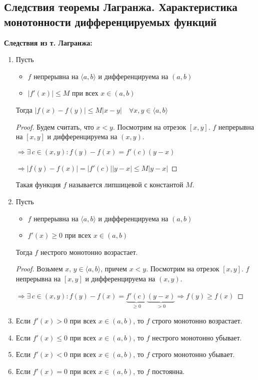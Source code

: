 \subsection{Следствия теоремы Лагранжа. Характеристика монотонности дифференцируемых функций \href{https://youtu.be/OXDjegAsmSU?t=6845}{\Walley}}
\textbf{Следствия из т. Лагранжа:}
\begin{enumerate}
    \item Пусть
    \begin{itemize}
        \item $f$ непрерывна на $\langle a, b \rangle$ и дифференцируема на $(a, b)$
        \item $|f'(x)| \leqslant M$ при всех $x \in (a, b)$
    \end{itemize}
    Тогда $|f(x) - f(y)| \leqslant M|x - y| \quad \forall x, y \in \langle a, b \rangle$
    \begin{proof}
        Будем считать, что $x < y$. Посмотрим на отрезок $[x, y]$. $f$ непрерывна на $[x, y]$ и дифференцируема на $(x, y)$. 

        $\Rightarrow \exists \, c \in (x, y) : f(y) - f(x) = f'(c)(y - x)$

        $\Rightarrow |f(y) - f(x)| = |f'(c)||y - x| \leqslant M|y - x|$
    \end{proof}
    \begin{notice}
        Такая функция $f$ называется липшицевой с константой $M$.
    \end{notice}
    \item Пусть
    \begin{itemize}
        \item $f$ непрерывна на $\langle a, b \rangle$ и дифференцируема на $(a, b)$
        \item $f'(x) \geqslant 0$ при всех $x \in (a, b)$
    \end{itemize}
    Тогда $f$ нестрого монотонно возрастает.
    \begin{proof}
        Возьмем $x, \, y \in \langle a, b \rangle$, причем $x < y$. 
        Посмотрим на отрезок $[x, y]$. $f$ непрерывна на $[x, y]$ и дифференцируема на $(x, y)$. 

        $\Rightarrow \exists \, c \in (x, y) : f(y) - f(x) = \underbrace{f'(c)}_{\geqslant 0}\underbrace{(y - x)}_{> 0} \Rightarrow f(y) \geqslant f(x)$
    \end{proof}
    \item Если $f'(x) > 0$ при всех $x \in (a, b)$, то $f$ строго монотонно возрастает.
    \item Если $f'(x) \leqslant 0$ при всех $x \in (a, b)$, то $f$ нестрого монотонно убывает.
    \item Если $f'(x) < 0$ при всех $x \in (a, b)$, то $f$ строго монотонно убывает.
    \item Если $f'(x) = 0$ при всех $x \in (a, b)$, то $f$ постоянна.
\end{enumerate}

